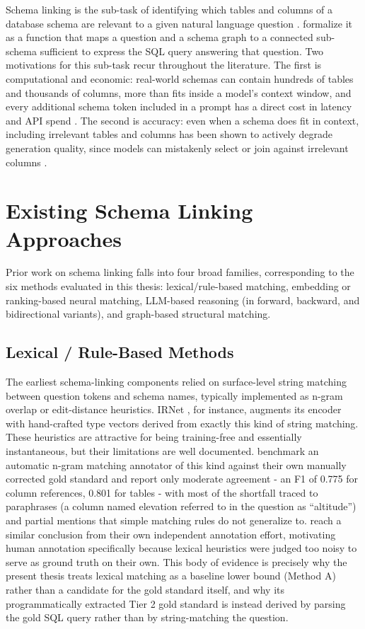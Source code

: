 Schema linking is the sub-task of identifying which tables and columns of a database schema are relevant to a given natural language question \citep{lei2020,wang2020}. \citet{safdarian2025} formalize it as a function that maps a question and a schema graph to a connected sub-schema sufficient to express the SQL query answering that question. Two motivations for this sub-task recur throughout the literature. The first is computational and economic: real-world schemas can contain hundreds of tables and thousands of columns, more than fits inside a model's context window, and every additional schema token included in a prompt has a direct cost in latency and API spend \citep{glass2025,wang2025b}. The second is accuracy: even when a schema does fit in context, including irrelevant tables and columns has been shown to actively degrade generation quality, since models can mistakenly select or join against irrelevant columns \citep{dong2023,maamari2024}.

\section{Existing Schema Linking Approaches}\label{sec:2-3}

Prior work on schema linking falls into four broad families, corresponding to the six methods evaluated in this thesis: lexical/rule-based matching, embedding or ranking-based neural matching, LLM-based reasoning (in forward, backward, and bidirectional variants), and graph-based structural matching.

\subsection{Lexical / Rule-Based Methods}\label{sec:2-3-1}

The earliest schema-linking components relied on surface-level string matching between question tokens and schema names, typically implemented as n-gram overlap or edit-distance heuristics. IRNet \citep{guo2019}, for instance, augments its encoder with hand-crafted type vectors derived from exactly this kind of string matching. These heuristics are attractive for being training-free and essentially instantaneous, but their limitations are well documented. \citet{lei2020} benchmark an automatic n-gram matching annotator of this kind against their own manually corrected gold standard and report only moderate agreement - an F1 of 0.775 for column references, 0.801 for tables - with most of the shortfall traced to paraphrases (a column named elevation referred to in the question as ``altitude'') and partial mentions that simple matching rules do not generalize to. \citet{taniguchi2021} reach a similar conclusion from their own independent annotation effort, motivating human annotation specifically because lexical heuristics were judged too noisy to serve as ground truth on their own. This body of evidence is precisely why the present thesis treats lexical matching as a baseline lower bound (Method A) rather than a candidate for the gold standard itself, and why its programmatically extracted Tier 2 gold standard is instead derived by parsing the gold SQL query rather than by string-matching the question.

